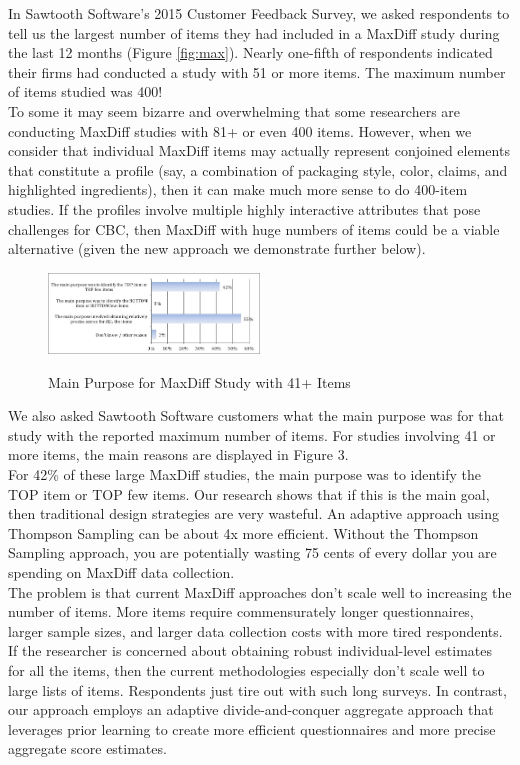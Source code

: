\documentclass[mksc,blindrev]{informs3} %
\begin{document}
In Sawtooth Software’s 2015 Customer Feedback Survey, we asked respondents to tell us the largest number of items they had included in a MaxDiff study during the last 12 months (Figure \ref{fig:max}).  Nearly one-fifth of respondents indicated their firms had conducted a study with 51 or more items.  The maximum number of items studied was 400!\\
To some it may seem bizarre and overwhelming that some researchers are conducting MaxDiff studies with 81+ or even 400 items.  However, when we consider that individual MaxDiff items may actually represent conjoined elements that constitute a profile (say, a combination of packaging style, color, claims, and highlighted ingredients), then it can make much more sense to do 400-item studies.  If the profiles involve multiple highly interactive attributes that pose challenges for CBC, then MaxDiff with huge numbers of items could be a viable alternative (given the new approach we demonstrate further below).\\
\begin{figure}[!ht]
\caption{Main Purpose for MaxDiff Study with 41+ Items}
\includegraphics[width=0.5\textwidth]{plots/maxdiffpurpose}
\label{fig:purpose}
\end{figure}
We also asked Sawtooth Software customers what the main purpose was for that study with the reported maximum number of items.  For studies involving 41 or more items, the main reasons are displayed in Figure 3.\\
For 42\% of these large MaxDiff studies, the main purpose was to identify the TOP item or TOP few items.  Our research shows that if this is the main goal, then traditional design strategies are very wasteful.  An adaptive approach using Thompson Sampling can be about 4x more efficient.  Without the Thompson Sampling approach, you are potentially wasting 75 cents of every dollar you are spending on MaxDiff data collection. \\
The problem is that current MaxDiff approaches don't scale well to increasing the number of items.  More items require commensurately longer questionnaires, larger sample sizes, and larger data collection costs with more tired respondents.  If the researcher is concerned about obtaining robust individual-level estimates for all the items, then the current methodologies especially don't scale well to large lists of items.  Respondents just tire out with such long surveys.  In contrast, our approach employs an adaptive divide-and-conquer aggregate approach that leverages prior learning to create more efficient questionnaires and more precise aggregate score estimates. \\
\end{document}
